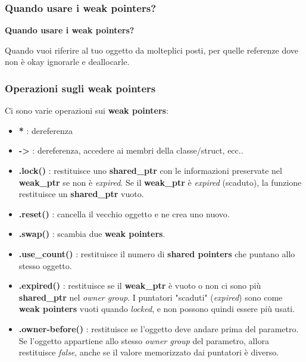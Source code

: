 \subsubsection{Quando usare i weak pointers?}

\textsf{\small \textbf{Quando usare i weak pointers?}} \break

\textsf{\small Quando vuoi riferire al tuo oggetto da molteplici posti, per quelle referenze dove non è okay ignorarle e deallocarle.} \\


\subsubsection{Operazioni sugli weak pointers}

\textsf{\small Ci sono varie operazioni sui \textbf{weak pointers}: } \\

\begin{itemize}
	\item \textsf{\small \textbf{*} : dereferenza}
	\item \textsf{\small \textbf{->} : dereferenza, accedere ai membri della classe/struct, ecc..}
	\item \textsf{\small \textbf{.lock()} : restituisce uno \textbf{shared\_ptr} con le informazioni preservate nel \textbf{weak\_ptr} se non è \emph{expired}. Se il \textbf{weak\_ptr} è \emph{expired} (scaduto), la funzione restituisce un \textbf{shared\_ptr} vuoto.}
	\item \textsf{\small \textbf{.reset()} : cancella il vecchio oggetto e ne crea uno nuovo.}
	\item \textsf{\small \textbf{.swap()} : scambia due \textbf{weak pointers}.}
	\item \textsf{\small \textbf{.use\_count()} : restituisce il numero di \textbf{shared pointers} che puntano allo stesso oggetto.}
	\item \textsf{\small \textbf{.expired()} : restituisce se il \textbf{weak\_ptr} è vuoto o non ci sono più \textbf{shared\_ptr} nel \emph{owner group}. I puntatori "scaduti" (\emph{expired}) sono come \textbf{weak pointers} vuoti quando \emph{locked}, e non possono quindi essere più usati.}
	\item \textsf{\small \textbf{.owner-before()} : restituisce se l'oggetto deve andare prima del parametro. Se l'oggetto appartiene allo stesso \emph{owner group} del parametro, allora restituisce \emph{false}, anche se il valore memorizzato dai puntatori è diverso.}
\end{itemize}

